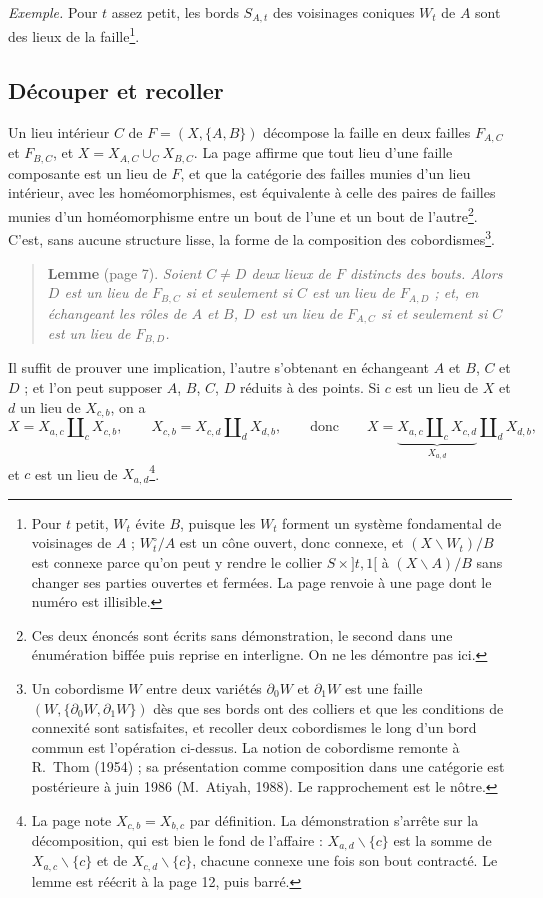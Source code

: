 \documentclass[11pt,a4paper]{article}
\begin{document}
\emph{Exemple.} Pour $t$ assez petit, les bords $S_{A,t}$ des voisinages coniques
$W_{t}$ de $A$ sont des lieux de la faille\footnote{Pour $t$ petit, $W_{t}$ évite
$B$, puisque les $W_{t}$ forment un système fondamental de voisinages de $A$ ;
$W_{t}^{\circ}/A$ est un cône ouvert, donc connexe, et
$(X \smallsetminus W_{t})/B$ est connexe parce qu'on peut y rendre le collier
$S \times {]t, 1[}$ à $(X \smallsetminus A)/B$ sans changer ses parties ouvertes
et fermées. La page renvoie à une page dont le numéro est illisible.}.

\subsection*{Découper et recoller}

Un lieu intérieur $C$ de $F = (X, \{A,B\})$ décompose la faille en deux failles
$F_{A,C}$ et $F_{B,C}$, et $X = X_{A,C} \cup_{C} X_{B,C}$. La page affirme que
tout lieu d'une faille composante est un lieu de $F$, et que la catégorie des
failles munies d'un lieu intérieur, avec les homéomorphismes, est équivalente à
celle des paires de failles munies d'un homéomorphisme entre un bout de l'une et
un bout de l'autre\footnote{Ces deux énoncés sont écrits sans démonstration, le
second dans une énumération biffée puis reprise en interligne. On ne les
démontre pas ici.}. C'est, sans aucune structure lisse, la forme de la
composition des cobordismes\footnote{Un cobordisme $W$ entre deux variétés
$\partial_{0} W$ et $\partial_{1} W$ est une faille $(W, \{\partial_{0}W,
\partial_{1}W\})$ dès que ses bords ont des colliers et que les conditions de
connexité sont satisfaites, et recoller deux cobordismes le long d'un bord commun
est l'opération ci-dessus. La notion de cobordisme remonte à R.~Thom (1954) ; sa
présentation comme composition dans une catégorie est postérieure à juin 1986
(M.~Atiyah, 1988). Le rapprochement est le nôtre.}.

\begin{quote}
\textbf{Lemme} (page 7). \emph{Soient $C \neq D$ deux lieux de $F$ distincts des
bouts. Alors $D$ est un lieu de $F_{B,C}$ si et seulement si $C$ est un lieu de
$F_{A,D}$ ; et, en échangeant les rôles de $A$ et $B$, $D$ est un lieu de
$F_{A,C}$ si et seulement si $C$ est un lieu de $F_{B,D}$.}
\end{quote}

Il suffit de prouver une implication, l'autre s'obtenant en échangeant $A$ et $B$,
$C$ et $D$ ; et l'on peut supposer $A$, $B$, $C$, $D$ réduits à des points. Si $c$
est un lieu de $X$ et $d$ un lieu de $X_{c,b}$, on a
\[
X = X_{a,c} \amalg_{c} X_{c,b}, \qquad X_{c,b} = X_{c,d} \amalg_{d} X_{d,b},
\qquad \text{donc} \qquad
X = \underbrace{X_{a,c} \amalg_{c} X_{c,d}}_{X_{a,d}} \amalg_{d} X_{d,b},
\]
et $c$ est un lieu de $X_{a,d}$\footnote{La page note $X_{c,b} = X_{b,c}$ par
définition. La démonstration s'arrête sur la décomposition, qui est bien le
fond de l'affaire : $X_{a,d} \smallsetminus \{c\}$ est la somme de
$X_{a,c} \smallsetminus \{c\}$ et de $X_{c,d} \smallsetminus \{c\}$, chacune
connexe une fois son bout contracté. Le lemme est réécrit à la page 12, puis
barré.}.
\end{document}
